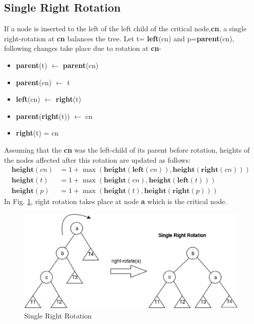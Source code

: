 \documentclass[MTech]{iitmdiss}
\begin{document}
\subsection{Single Right Rotation}
If a node is inserted to the left of the left child of the critical node,\textbf{cn}, a single right-rotation at \textbf{cn} balances the tree. Let t= \textbf{left}(cn) and p=\textbf{parent}(cn), following changes take place due to rotation at \textbf{cn}-
\begin{itemize}
\item \textbf{parent}(t) $\leftarrow$ \textbf{parent}(cn)
\item \textbf{parent}(cn) $\leftarrow$ t
\item \textbf{left}(cn) $\leftarrow$ \textbf{right}(t)
\item \textbf{parent}(\textbf{right}(t)) $\leftarrow$ cn
\item \textbf{right}(t) = cn
\end{itemize}
Assuming that the \textbf{cn} was the left-child of its parent before rotation, heights of the nodes affected after this rotation are updated as follows:
\begin{align*}
	\textbf{height}(cn) &= 1 + \max(\textbf{height}(\textbf{left}(cn)),\textbf{height}(\textbf{right}(cn)))\\
    \textbf{height}(t) &= 1 + \max(\textbf{height}(cn), \textbf{height}(\textbf{left}(t)))\\
    \textbf{height}(p) &= 1 + \max(\textbf{height}(t), \textbf{height}(\textbf{right}(p)))
\end{align*}
In Fig. \ref{fig:single_right}, right rotation takes place at node \textbf{a} which is the critical node. 


\begin{figure}
\centering
\includegraphics[width=12cm,height=5cm]{Single_Right}
\caption{Single Right Rotation}
\label{fig:single_right}
\end{figure}
\end{document}
